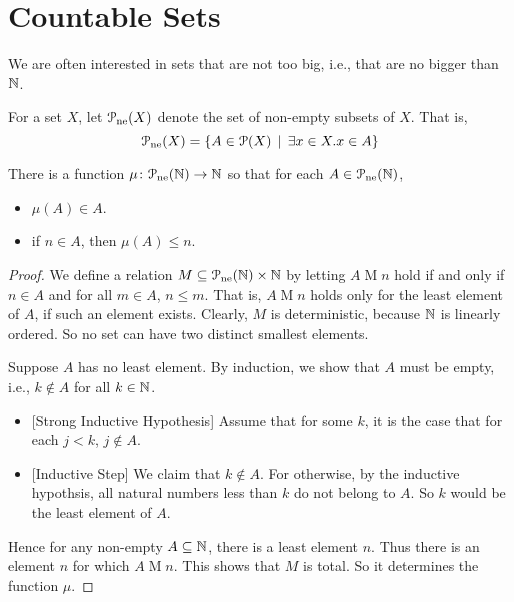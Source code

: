 \chapter{Countable Sets}

We are often interested in sets that are not too big, i.e., that are no bigger than $\mathbb N$.


\begin{defn}
	For a set $X$, let ${\mathcal{P}}_{\text{ne}}(X)$ denote the set of non-empty subsets of $X$. That is, \[{\mathcal{P}}_{\text{ne}}(X) = \{A\in{\mathcal{P}}(X)\,\mid\, \exists x\in X.x\in A\}\]
\end{defn}

\begin{lemma}
	There is a function ${\mu}\colon{{\mathcal{P}}_{\text{ne}}(\mathbb N)}\to{\mathbb N}$ so that for each $A\in {\mathcal{P}}_{\text{ne}}(\mathbb N)$, 
	\begin{itemize}
		\item $\mu(A)\in A$.
		\item if $n\in A$, then $\mu(A)\leq n$.
	\end{itemize}
	
	\begin{proof}
		We define a relation $M\subseteq{{\mathcal{P}}_{\text{ne}}(\mathbb N)\times \mathbb N}$ by letting $A\mathrel{M} n$ hold if and only if $n\in A$ and for all $m\in A$, $n\leq m$. 
		That is, $A\mathrel{M} n$ holds only for the least element of $A$, if such an element exists.
		Clearly, $M$ is deterministic, because $\mathbb N$ is linearly ordered.
		So no set can have two distinct smallest elements.
		
		Suppose $A$ has no least element. By induction, we show that $A$ must be empty, i.e., $k\notin A$ for all $k\in \mathbb N$.
		\begin{itemize}
			\item{}[Strong Inductive Hypothesis] Assume that for some $k$, it is the case that for each $j<k$, $j\notin A$. 
			\item{}[Inductive Step] We claim that $k\notin A$. 
			For otherwise, by the inductive hypothsis, all natural numbers less than $k$ do not belong to $A$. 
			So $k$ would be the least element of $A$. 
		\end{itemize} 
		Hence for any non-empty $A\subseteq \mathbb N$, there is a least element $n$. 
		Thus there is an element $n$ for which $A\mathrel{M}n$. 
		This shows that $M$ is total. 
		So it determines the function $\mu$.
	\end{proof}
\end{lemma}

